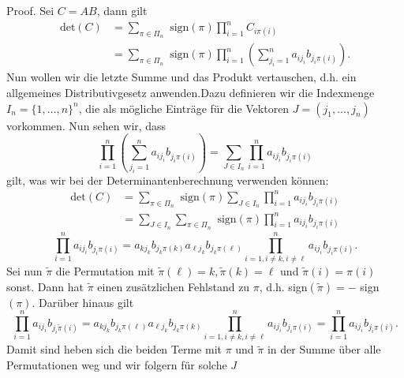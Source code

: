 \begin{emphBox}{}{}
Proof.  Sei \(C=AB\), dann gilt
\begin{align*}
\text{det}(C) &= \sum_{\pi \in \Pi_n} \text{ sign}(\pi) \prod_{i=1}^n C_{i\pi(i)} \\
&= \sum_{\pi \in \Pi_n} \text{ sign}(\pi) \prod_{i=1}^n ( \sum_{j_i=1}^n a_{ij_i} b_{j_i\pi(i)})  .
\end{align*}
Nun wollen wir die letzte Summe und das Produkt vertauschen, d.h. ein allgemeines Distributivgesetz anwenden.Dazu definieren wir die Indexmenge \( I_n = \{1,\ldots,n\}^n\), die als mögliche Einträge für die Vektoren \(J=(j_1,\ldots,j_n)\) vorkommen. Nun sehen wir, dass
\begin{equation*}
 \prod_{i=1}^n ( \sum_{j_i=1}^n a_{ij_i} b_{j_i\pi(i)}) = \sum_{J \in I_n} \prod_{i=1}^n  a_{ij_i} b_{j_i\pi(i)}
\end{equation*}
gilt, was wir bei der Determinantenberechnung verwenden können:
\begin{align*} \text{det}(C) &= \sum_{\pi \in \Pi_n} \text{ sign}(\pi) \sum_{J \in I_n} \prod_{i=1}^n  a_{ij_i} b_{j_i\pi(i)}  \\ &= \sum_{J \in I_n}  \sum_{\pi \in \Pi_n} \text{ sign}(\pi)\prod_{i=1}^n  a_{ij_i} b_{j_i\pi(i)}\end{align*}\begin{equation*}
 \prod_{i=1}^n  a_{ij_i} b_{j_i\pi(i)} = a_{kj_k} b_{j_k\pi(k)} a_{\ell j_k} b_{j_k\pi(\ell)} \prod_{i=1, i \neq k, i \neq \ell}^n  a_{ij_i} b_{j_i\pi(i)}.\end{equation*}
Sei nun \(\tilde \pi\) die Permutation mit \(\tilde \pi(\ell)=k, \tilde \pi(k) = \ell\) und \(\tilde \pi(i)=\pi(i)\) sonst. Dann hat \(\tilde \pi\) einen zusätzlichen Fehlstand zu \(\pi\), d.h. sign\((\tilde \pi)= - \) sign\((\pi)\). Darüber hinaus gilt
\begin{equation*}
 \prod_{i=1}^n  a_{ij_i} b_{j_i\tilde \pi(i)} = a_{kj_k} b_{j_k\pi(\ell)} a_{\ell j_k} b_{j_k\pi(k)} \prod_{i=1, i \neq k, i \neq \ell}^n  a_{ij_i} b_{j_i\pi(i)} = \prod_{i=1}^n  a_{ij_i} b_{j_i\pi(i)} .\end{equation*}
Damit sind heben sich die beiden Terme mit \(\pi\) und \(\tilde \pi\) in der Summe über alle Permutationen weg und wir folgern für solche \(J\)
\begin{equation*}

\end{equation*}
\end{emphBox}
